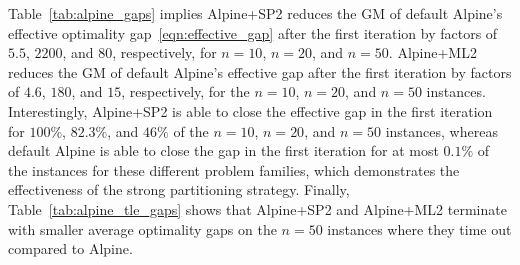 \documentclass{article}
\begin{document}
Table~\ref{tab:alpine_gaps} implies Alpine+SP2 reduces the GM of default Alpine's effective optimality gap~\eqref{eqn:effective_gap} after the first iteration by factors of $5.5$, $2200$, and $80$, respectively, for $n = 10$, $n = 20$, and $n = 50$.
Alpine+ML2 reduces the GM of default Alpine's effective gap after the first iteration by factors of $4.6$, $180$, and $15$, respectively, for the $n = 10$, $n = 20$, and $n = 50$ instances.
Interestingly, Alpine+SP2 is able to close the effective gap in the first iteration for $100\%$, $82.3\%$, and $46\%$ of the $n = 10$, $n = 20$, and $n = 50$ instances, whereas default Alpine is able to close the gap in the first iteration for at most $0.1\%$ of the instances for these different problem families, which demonstrates the effectiveness of the strong partitioning strategy.
Finally, 
Table~\ref{tab:alpine_tle_gaps} shows that Alpine+SP2 and Alpine+ML2 terminate with smaller average optimality gaps on the $n = 50$ instances where they time out compared to Alpine.
\end{document}

